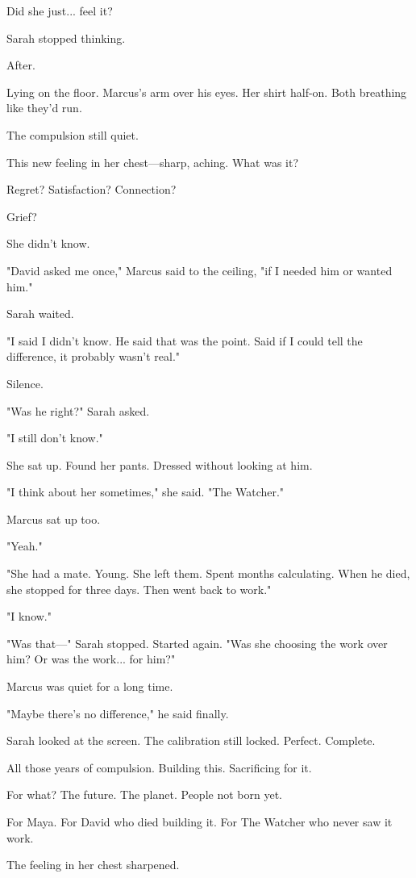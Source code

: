 Did she just... feel it?

Sarah stopped thinking.

\scenebreak

After.

Lying on the floor. Marcus's arm over his eyes. Her shirt half-on. Both breathing like they'd run.

The compulsion still quiet.

This new feeling in her chest—sharp, aching. What was it?

Regret? Satisfaction? Connection?

Grief?

She didn't know.

"David asked me once," Marcus said to the ceiling, "if I needed him or wanted him."

Sarah waited.

"I said I didn't know. He said that was the point. Said if I could tell the difference, it probably wasn't real."

Silence.

"Was he right?" Sarah asked.

"I still don't know."

She sat up. Found her pants. Dressed without looking at him.

"I think about her sometimes," she said. "The Watcher."

Marcus sat up too.

"Yeah."

"She had a mate. Young. She left them. Spent months calculating. When he died, she stopped for three days. Then went back to work."

"I know."

"Was that—" Sarah stopped. Started again. "Was she choosing the work over him? Or was the work... for him?"

Marcus was quiet for a long time.

"Maybe there's no difference," he said finally.

Sarah looked at the screen. The calibration still locked. Perfect. Complete.

All those years of compulsion. Building this. Sacrificing for it.

For what? The future. The planet. People not born yet.

For Maya. For David who died building it. For The Watcher who never saw it work.

The feeling in her chest sharpened.

